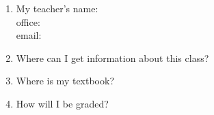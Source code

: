\documentclass[11pt,fleqn]{article}
\begin{document}
\renewcommand{\headrulewidth}{0pt}
\newcommand{\blank}[1]{\rule{#1}{0.75pt}}
\renewcommand{\d}{\displaystyle}
\vspace*{-0.7in}
\begin{center}
  \large {}
\end{center}


\begin{enumerate}
\item My teacher's name: \underline{\hspace{2in}}\\ office:  \underline{\hspace{2in}}\\ email:  \underline{\hspace{2in}}\\


\item Where can I get information about this class?\\

\vfill
\item Where is my textbook?\\
\vfill
\item How will I be graded? \\
\vfill


\end{enumerate}
\end{document}
